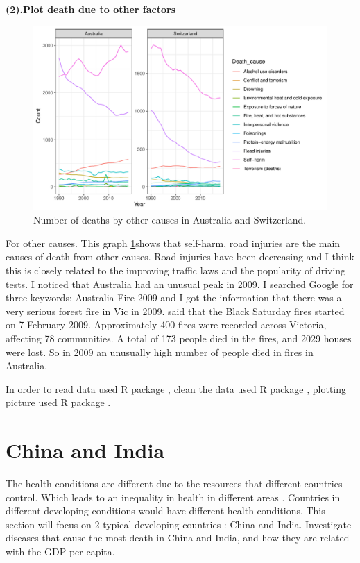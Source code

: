 \documentclass[11pt,a4paper,]{article}
\begin{document}
\textbf{(2).Plot death due to other factors}

\begin{figure}
\centering
\includegraphics{Assignment4_files/figure-latex/otherplot-1.pdf}
\caption{\label{fig:otherplot}Number of deaths by other causes in Australia and Switzerland.}
\end{figure}

For other causes. This graph \ref{fig:otherplot}shows that self-harm, road injuries are the main causes of death from other causes. Road injuries have been decreasing and I think this is closely related to the improving traffic laws and the popularity of driving tests. I noticed that Australia had an unusual peak in 2009. I searched Google for three keywords: Australia Fire 2009 and I got the information that there was a very serious forest fire in Vic in 2009. \textcite{Bushfire} said that the Black Saturday fires started on 7 February 2009. Approximately 400 fires were recorded across Victoria, affecting 78 communities. A total of 173 people died in the fires, and 2029 houses were lost. So in 2009 an unusually high number of people died in fires in Australia.

In order to read data used R package \textcite{readr}, clean the data used R package \textcite{tidyverse}, plotting picture used R package \textcite{ggplot2}.

\clearpage

\hypertarget{china-and-india}{%
\section{China and India}\label{china-and-india}}

The health conditions are different due to the resources that different countries control. Which leads to an inequality in health in different areas \textcite{emadi2021global}. Countries in different developing conditions would have different health conditions. This section will focus on 2 typical developing countries : China and India. Investigate diseases that cause the most death in China and India, and how they are related with the GDP per capita.
\end{document}

